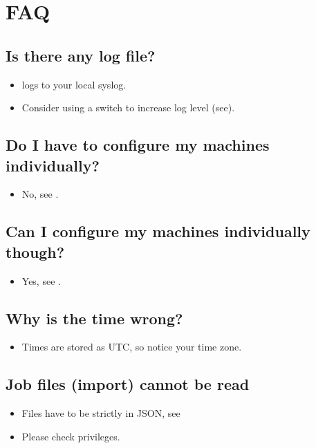 \section{FAQ}

\subsection*{Is there any log file?}
\begin{itemize}
\item \sw logs to your local syslog.
\item Consider using a switch to increase log level (see).
\end{itemize}

\subsection*{Do I have to configure my machines individually?}
\begin{itemize}
\item No, see .
\end{itemize}

\subsection*{Can I configure my machines individually though?}
\begin{itemize}
\item Yes, see .
\end{itemize}

\subsection*{Why is the time wrong?}
\begin{itemize}
\item Times are stored as UTC, so notice your time zone.
\end{itemize}

\subsection*{Job files (import) cannot be read}
\begin{itemize}
\item Files have to be strictly in JSON, see 
\item Please check privileges.
\end{itemize}

